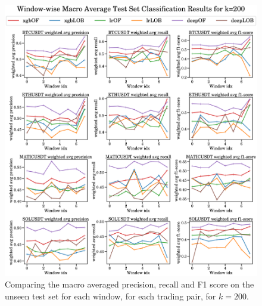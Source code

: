 \begin{figure}[htpb!]
    \centering
    \includegraphics[width=1.0\textwidth]{./images/macro_results_k=200.pdf}
    \caption{Comparing the macro averaged precision, recall and F1 score on the unseen test set for each window, for each trading pair, for $k=200$.}
    \label{macro_plots_4}
\end{figure}

